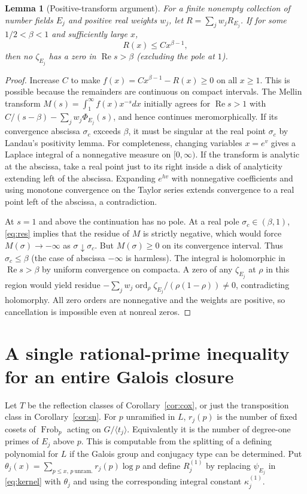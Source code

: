 \documentclass[11pt]{article}
\newtheorem{lemma}[theorem]{Lemma}
\theoremstyle{remark}\newtheorem{remark}[theorem]{Remark}
\newcommand{\ord}{\operatorname{ord}}
\newcommand{\Rea}{\operatorname{Re}}
\newcommand{\Frob}{\operatorname{Frob}}
\begin{document}
\begin{lemma}[Positive-transform argument]\label{lem:landau}
For a finite nonempty collection of number fields $E_j$ and positive real weights $w_j$, let $R=\sum_j w_jR_{E_j}$. If for some $1/2<\beta<1$ and sufficiently large $x$,
\[
 R(x)\le C x^{\beta-1},
\]
then no $\zeta_{E_j}$ has a zero in $\Rea s>\beta$ (excluding the pole at $1$).
\end{lemma}
\begin{proof}
Increase $C$ to make $f(x)=Cx^{\beta-1}-R(x)\ge0$ on all $x\ge1$. This is possible because the remainders are continuous on compact intervals. The Mellin transform $M(s)=\int_1^\infty f(x)x^{-s}dx$ initially agrees for $\Rea s>1$ with $C/(s-\beta)-\sum_j w_j\Phi_{E_j}(s)$, and hence continues meromorphically. If its convergence abscissa $\sigma_c$ exceeds $\beta$, it must be singular at the real point $\sigma_c$ by Landau's positivity lemma. For completeness, changing variables $x=e^v$ gives a Laplace integral of a nonnegative measure on $[0,\infty)$. If the transform is analytic at the abscissa, take a real point just to its right inside a disk of analyticity extending left of the abscissa. Expanding $e^{hv}$ with nonnegative coefficients and using monotone convergence on the Taylor series extends convergence to a real point left of the abscissa, a contradiction.

At $s=1$ and above the continuation has no pole. At a real pole $\sigma_c\in(\beta,1)$, \eqref{eq:res} implies that the residue of $M$ is strictly negative, which would force $M(\sigma)\to-\infty$ as $\sigma\downarrow\sigma_c$. But $M(\sigma)\ge0$ on its convergence interval. Thus $\sigma_c\le\beta$ (the case of abscissa $-\infty$ is harmless). The integral is holomorphic in $\Rea s>\beta$ by uniform convergence on compacta. A zero of any $\zeta_{E_j}$ at $\rho$ in this region would yield residue $-\sum_j w_j\ord_\rho\zeta_{E_j}/(\rho(1-\rho))\ne0$, contradicting holomorphy. All zero orders are nonnegative and the weights are positive, so cancellation is impossible even at nonreal zeros.
\end{proof}

\section{A single rational-prime inequality for an entire Galois closure}
\label{sec:prime}
Let $T$ be the reflection classes of Corollary~\ref{cor:cox}, or just the transposition class in Corollary~\ref{cor:sn}. For $p$ unramified in $L$, $r_j(p)$ is the number of fixed cosets of $\Frob_p$ acting on $G/\langle t_j\rangle$. Equivalently it is the number of degree-one primes of $E_j$ above $p$. This is computable from the splitting of a defining polynomial for $L$ if the Galois group and conjugacy type can be determined. Put $\theta_j(x)=\sum_{p\le x,\,p\ \mathrm{unram.}} r_j(p)\log p$ and define $R_j^{(1)}$ by replacing $\psi_{E_j}$ in \eqref{eq:kernel} with $\theta_j$ and using the corresponding integral constant $\kappa_j^{(1)}$.
\end{document}

